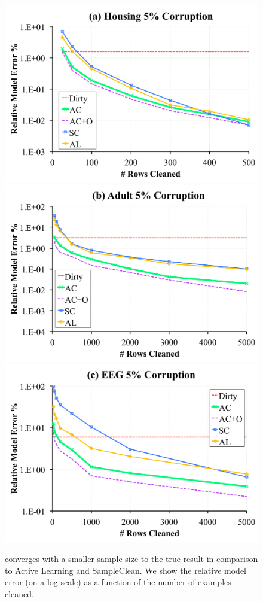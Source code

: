 \begin{figure}[t]
\centering
 \includegraphics[scale=0.15]{exp/exp3a.pdf}
 \includegraphics[scale=0.15]{exp/exp3b.pdf}
  \includegraphics[scale=0.15]{exp/exp3c.pdf}
 \caption{\sys converges with a smaller sample size to the true result in comparison to Active Learning and SampleClean. We show the relative model error (on a log scale) as a function of the number of examples cleaned. \label{prio-perf}}
\end{figure}

